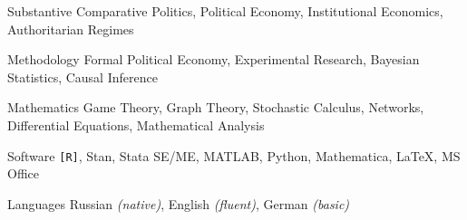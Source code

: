 

\begin{cvskills}

\cvskill
    {Substantive} %
    {Comparative Politics, Political Economy, Institutional Economics, Authoritarian Regimes}

\cvskill
    {Methodology} %
    {Formal Political Economy, Experimental Research, Bayesian Statistics, Causal Inference}

\cvskill
    {Mathematics} %
    {Game Theory, Graph Theory, Stochastic Calculus, Networks, Differential Equations, Mathematical Analysis}

\cvskill
    {Software} %
    {\texttt{[R]}, Stan, Stata SE/ME, MATLAB, Python, Mathematica, \LaTeX, MS Office} %


  \cvskill
    {Languages} %
    {Russian \emph{(native)}, English \emph{(fluent)}, German \emph{(basic)}} %

\end{cvskills}
